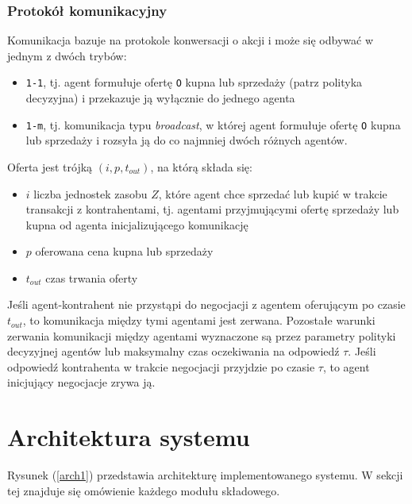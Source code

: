 \documentclass{article}
\providecommand{\tightlist}{%
  \setlength{\itemsep}{0pt}\setlength{\parskip}{0pt}}
\begin{document}
\subsubsection{Protokół komunikacyjny}

Komunikacja bazuje na protokole konwersacji o akcji i może się odbywać w jednym z dwóch trybów:

\begin{itemize}
\tightlist
\item
  \texttt{1-1}, tj. agent formułuje ofertę \texttt{O} kupna lub
  sprzedaży (patrz polityka decyzyjna) i przekazuje ją wyłącznie do
  jednego agenta
\item
  \texttt{1-m}, tj. komunikacja typu \emph{broadcast}, w której agent
  formułuje ofertę \texttt{O} kupna lub sprzedaży i rozsyła ją do co
  najmniej dwóch różnych agentów.
\end{itemize}

Oferta jest trójką \((i, p, t_{out})\), na którą składa się:

\begin{itemize}
\tightlist
\item
  \(i\) liczba jednostek zasobu \(Z\), które agent chce sprzedać lub
  kupić w trakcie transakcji z kontrahentami, tj. agentami przyjmującymi
  ofertę sprzedaży lub kupna od agenta inicjalizującego komunikację
\item
  \(p\) oferowana cena kupna lub sprzedaży
\item
  \(t_{out}\) czas trwania oferty
\end{itemize}

Jeśli agent-kontrahent nie przystąpi do negocjacji z agentem oferującym
po czasie \(t_{out}\), to komunikacja między tymi agentami jest zerwana.
Pozostałe warunki zerwania komunikacji między agentami wyznaczone są
przez parametry polityki decyzyjnej agentów lub maksymalny czas
oczekiwania na odpowiedź \(\tau\). Jeśli odpowiedź kontrahenta w trakcie
negocjacji przyjdzie po czasie \(\tau\), to agent inicjujący negocjacje
zrywa ją.

\section{Architektura systemu \label{sec2}}

Rysunek (\ref{arch1}) przedstawia architekturę implementowanego systemu. W sekcji tej znajduje się 
omówienie każdego modułu składowego.
\end{document}
